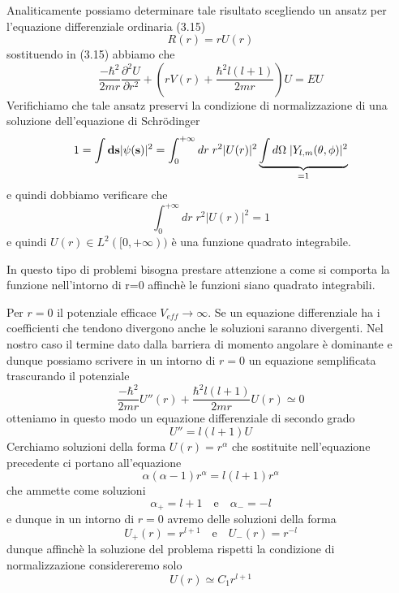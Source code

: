 Analiticamente possiamo determinare tale risultato scegliendo un ansatz per l'equazione differenziale ordinaria (3.15)
\begin{equation*}
	R(r) = r U(r)
\end{equation*}
sostituendo in (3.15) abbiamo che 
\begin{equation*}
	\frac{-\hbar^2}{2mr} \frac{\partial^2U}{\partial r^2} + \left( rV(r) + \frac{\hbar^2l(l+1)}{2mr} \right)U = EU
\end{equation*}
Verifichiamo che tale ansatz preservi la condizione di normalizzazione di una soluzione dell'equazione di Schr\"odinger 
\begin{equation*}
	1 = \int\bold{ds}|\psi(\bold{s})|^2 = \int_{0}^{+ \infty}dr \; r^2|U(r)|^2 \underbrace{\int d\Omega \; |Y_{l,m}(\theta,\phi)|^2}_{=1}
\end{equation*}
e quindi dobbiamo verificare che 
\begin{equation*}
	\int_{0}^{+ \infty}dr \; r^2|U(r)|^2 =1 
\end{equation*}
e quindi  $U(r) \in L^2([0,+\infty))$ \`e una funzione quadrato integrabile.

\noindent In questo tipo di problemi bisogna prestare attenzione a come si comporta la funzione nell'intorno di r=0 affinch\`e le funzioni siano quadrato integrabili.

Per $r = 0$ il potenziale efficace $V_{eff} \to \infty$. Se un equazione differenziale ha i coefficienti che tendono divergono anche le soluzioni saranno divergenti. Nel nostro caso il termine dato dalla barriera di momento angolare \`e dominante e dunque possiamo scrivere in un intorno di $r=0$ un equazione semplificata trascurando il potenziale
\begin{equation*}
	\frac{-\hbar^2}{2mr}U''(r) + \frac{\hbar^2l(l+1)}{2mr}U(r) \simeq 0
\end{equation*}
otteniamo in questo modo un equazione differenziale di secondo grado
\begin{equation*}
	U'' = l(l+1)U
\end{equation*}
Cerchiamo soluzioni della forma $U(r) = r^\alpha$ che sostituite nell'equazione precedente ci portano all'equazione 
\begin{equation*}
	\alpha(\alpha-1) r^\alpha = l(l+1)r^\alpha 
\end{equation*}
che ammette come soluzioni 
\begin{equation*}
	\alpha_+ = l+1 \quad \text{e} \quad \alpha_- =-l
\end{equation*}
e dunque in un intorno di $r=0$ avremo delle soluzioni della forma
\begin{equation*}
	U_+ (r) = r^{l+1} \quad \text{e} \quad U_{-}(r) = r^{-l}
\end{equation*}
dunque affinch\`e la soluzione del problema rispetti la condizione di normalizzazione considereremo solo 
\begin{equation*}
	U(r) \simeq C_1r^{l+1}
\end{equation*}


